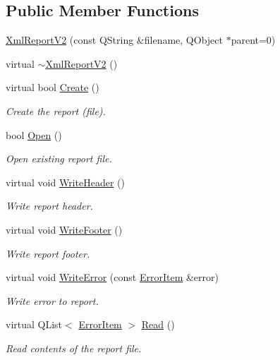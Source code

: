\subsection*{Public Member Functions}
\begin{DoxyCompactItemize}
\item 
\hyperlink{class_xml_report_v2_a6d62f9aba9d9d7dc86ba332958c00791}{Xml\-Report\-V2} (const Q\-String \&filename, Q\-Object $\ast$parent=0)
\item 
virtual \hyperlink{class_xml_report_v2_a83baaf942f9aea714936bd78dc0653de}{$\sim$\-Xml\-Report\-V2} ()
\item 
virtual bool \hyperlink{class_xml_report_v2_aa111ee5e6d9eed7c8ef3ea981170ad00}{Create} ()
\begin{DoxyCompactList}\small\item\em Create the report (file). \end{DoxyCompactList}\item 
bool \hyperlink{class_xml_report_v2_a2d85311ff62d2ae9b60b95ffc549c438}{Open} ()
\begin{DoxyCompactList}\small\item\em Open existing report file. \end{DoxyCompactList}\item 
virtual void \hyperlink{class_xml_report_v2_ab1ab90f787ce58301c956e69d375b312}{Write\-Header} ()
\begin{DoxyCompactList}\small\item\em Write report header. \end{DoxyCompactList}\item 
virtual void \hyperlink{class_xml_report_v2_adb5ae38ea29c981a5b23526c41b60c57}{Write\-Footer} ()
\begin{DoxyCompactList}\small\item\em Write report footer. \end{DoxyCompactList}\item 
virtual void \hyperlink{class_xml_report_v2_a4fb22a648c9b703b9d134eb36e47547c}{Write\-Error} (const \hyperlink{class_error_item}{Error\-Item} \&error)
\begin{DoxyCompactList}\small\item\em Write error to report. \end{DoxyCompactList}\item 
virtual Q\-List$<$ \hyperlink{class_error_item}{Error\-Item} $>$ \hyperlink{class_xml_report_v2_a98504e1389bba9a08f6e4a123093a02a}{Read} ()
\begin{DoxyCompactList}\small\item\em Read contents of the report file. \end{DoxyCompactList}\end{DoxyCompactItemize}

